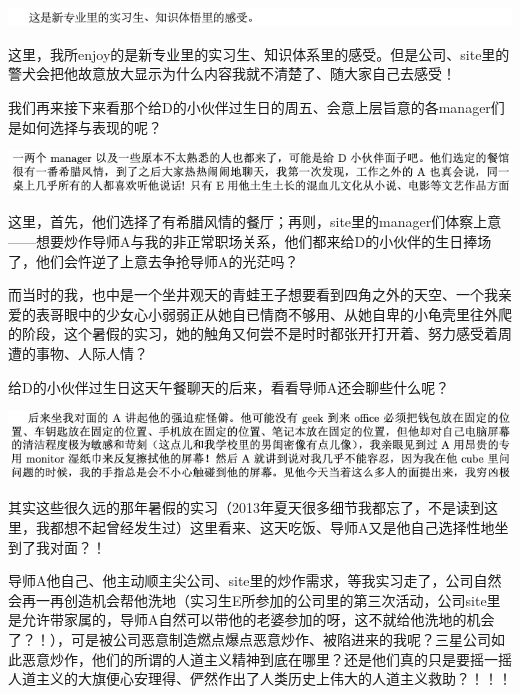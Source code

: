 \documentclass[9pt, b5paper]{article}
\begin{document}
\begin{center}
\includegraphics[width=.9\linewidth]{./pic/backups_plans_20210513_111000.png}
\end{center}

这里，我所enjoy的是新专业里的实习生、知识体系里的感受。但是公司、site里的警犬会把他故意放大显示为什么内容我就不清楚了、随大家自己去感受！

我们再来接下来看那个给D的小伙伴过生日的周五、会意上层旨意的各manager们是如何选择与表现的呢？

\begin{center}
\includegraphics[width=.9\linewidth]{./pic/backups_plans_20210513_111531.png}
\end{center}

这里，首先，他们选择了有希腊风情的餐厅；再则，site里的manager们体察上意——想要炒作导师A与我的非正常职场关系，他们都来给D的小伙伴的生日捧场了，他们会忤逆了上意去争抢导师A的光茫吗？

而当时的我，也中是一个坐井观天的青蛙王子想要看到四角之外的天空、一个我亲爱的表哥眼中的少女心小弱弱正从她自已情商不够用、从她自卑的小龟壳里往外爬的阶段，这个暑假的实习，她的触角又何尝不是时时都张开打开着、努力感受着周遭的事物、人际人情？

给D的小伙伴过生日这天午餐聊天的后来，看看导师A还会聊些什么呢？

\begin{center}
\includegraphics[width=.9\linewidth]{./pic/backups_plans_20210513_112149.png}
\end{center}

其实这些很久远的那年暑假的实习（2013年夏天很多细节我都忘了，不是读到这里，我都想不起曾经发生过）这里看来、这天吃饭、导师A又是他自己选择性地坐到了我对面？！

导师A他自己、他主动顺主尖公司、site里的炒作需求，等我实习走了，公司自然会再一再创造机会帮他洗地（实习生E所参加的公司里的第三次活动，公司site里是允许带家属的，导师A自然可以带他的老婆参加的呀，这不就给他洗地的机会了？！），可是被公司恶意制造燃点爆点恶意炒作、被陷进来的我呢？三星公司如此恶意炒作，他们的所谓的人道主义精神到底在哪里？还是他们真的只是要摇一摇人道主义的大旗便心安理得、俨然作出了人类历史上伟大的人道主义救助？！！！
\end{document}
